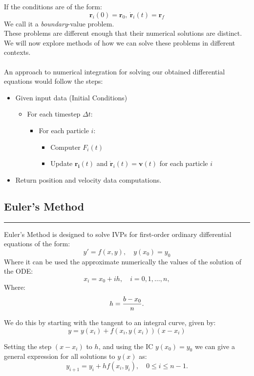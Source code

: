 \documentclass[hidelinks, 11pt, dvipsnames]{article}
\newcommand{\psubsection}[1]{{
    \begin{center}
            \section*{\Large #1}
        \noindent \rule{17cm}{0.2pt}
    \end{center}
}}
\begin{document}
If the conditions are of the form:
$$ \mathbf{r}_i(0) = \mathbf{r}_0,\ \mathbf{\dot{r}}_i(t) = \mathbf{r}_f $$
We call it a \emph{boundary}-value problem.\\

These problems are different enough that their numerical solutions are distinct.\\

We will now explore methods of how we can solve these problems in different contexts.\\
\\

An approach to numerical integration for solving our obtained differential equations would follow the steps:
\begin{itemize}
    \item Given input data (Initial Conditions)
    \begin{itemize}
        \item For each timestep $\Delta t$:
        \begin{itemize}
            \item For each particle $i$:
            \begin{itemize}
                \item Computer $F_i(t)$
                \item Update $\mathbf{r_i}(t)$ and $\mathbf{\dot{r}}_i(t) = \mathbf{v}(t)$ for each particle $i$
            \end{itemize}
        \end{itemize}
    \end{itemize}
    \item Return position and velocity data computations.
\end{itemize}
\newpage

\psubsection{Euler's Method}
Euler's Method is designed to solve IVPs for first-order ordinary differential equations of the form:
$$ \label{eq:3.1.1} y'=f(x,y),\quad y(x_0)=y_0 $$
Where it can be used the approximate numerically the values of the solution of the ODE: 
$$ x_i=x_0+ih,\quad i=0,1, \dots,n, \nonumber $$
Where:
$$ h={b-x_0\over n}.\nonumber $$

We do this by starting with the tangent to an integral curve, given by:
$$ \label{eq:3.1.2} y=y(x_i)+f(x_i,y(x_i))(x-x_i) $$

Setting the step $(x-x_i)$ to $h$, and using the IC $y(x_0) = y_0$ we can give a general expression for all solutions to $y(x)$ as:
$$ \label{eq:3.1.4} y_{i+1}=y_i+hf(x_i,y_i),\quad 0\le i\le n-1. $$
\end{document}
